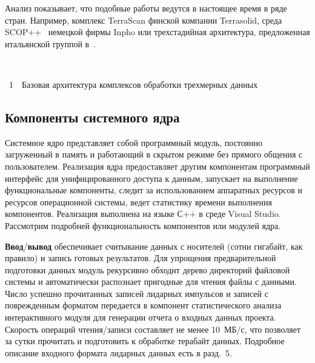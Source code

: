 \begin{multicols}{2}
   Анализ показывает, что подобные работы ведутся в настоящее время в ряде 
стран. Например, комплекс TerraScan финской компании Terrasolid, среда 
SCOP++~\cite{3su} немецкой фирмы Inpho или трехстадийная архитектура, 
предложенная итальянской группой в~\cite{4su}.


\noindent
\begin{center}
\vspace*{18pt}
\mbox{%
\epsfxsize=78.59mm
}
\end{center}
\vspace*{12pt}
{{\figurename~1}\ \ \small{Базовая архитектура комплексов обработки 
трехмерных данных}}

\bigskip
\addtocounter{figure}{1}
  
\subsection{Компоненты системного ядра} %
  
   Системное ядро представляет собой про\-грам\-мный модуль, постоянно 
загруженный в память и работающий в скрытом режиме без прямого общения с 
пользователем. Реализация ядра предоставляет другим компонентам 
программный интерфейс для унифицированного доступа к данным, запускает 
на выполнение функциональные компоненты, следит за использованием 
аппаратных ресурсов и ресурсов операционной системы, ведет статистику времени выполнения 
компонентов. Реализация выполнена на языке С++ в среде Visual Studio. 
Рассмотрим подробней функциональность компонентов или модулей ядра.
   
   \textbf{Ввод}/\textbf{вывод} обеспечивает считывание данных с носителей 
(сотни гигабайт, как правило) и запись готовых результатов. Для упрощения 
предварительной подготовки данных модуль рекурсивно обходит дерево 
директорий файловой системы и автоматически распознает пригодные для 
чтения файлы с данными. Число успешно прочитанных записей лидарных 
импульсов и записей с поврежденным форматом передается в компонент 
статистического анализа интерактивного модуля для генерации отчета о 
входных данных проекта. Скорость операций чтения/записи составляет не 
менее 10~МБ/с, что позволяет за сутки прочитать и подготовить к обработке 
терабайт данных. Подробное описание входного формата лидарных данных 
есть в разд.~5.
{

}
   

\end{multicols}
